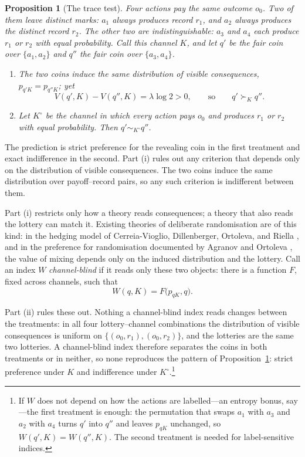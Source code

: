 \documentclass[11pt,a4paper]{article}
\newtheorem{proposition}[theorem]{Proposition}
\theoremstyle{definition}
\newcommand{\1}{\mathbf 1}
\begin{document}
\begin{proposition}[The trace test]\label{prop:signature}
Four actions pay the same outcome $o_0$.  Two of them leave distinct marks: $a_1$ always produces record $r_1$,
and $a_2$ always produces the distinct record $r_2$.  The other two are indistinguishable: $a_3$ and $a_4$ each
produce $r_1$ or $r_2$ with equal probability.  Call this channel $K$, and let $q'$ be the fair coin over
$\{a_1,a_2\}$ and $q''$ the fair coin over $\{a_3,a_4\}$.
\begin{enumerate}[label=\textup{(\roman*)},leftmargin=*]
\item The two coins induce the same distribution of visible consequences, $p_{q'K}=p_{q''K}$; yet
\[
 V(q',K)-V(q'',K)=\lambda\log2>0,
 \qquad\text{so}\qquad
 q'\succ_Kq''.
\]
\item Let $K^\circ$ be the channel in which every action pays $o_0$ and produces $r_1$ or $r_2$ with equal
probability.  Then $q'\sim_{K^\circ}q''$.
\end{enumerate}
\end{proposition}

The prediction is strict preference for the revealing coin in the first treatment and exact indifference in the
second.  Part \textup{(i)} rules out any criterion that depends only on the distribution of visible consequences.
The two coins induce the same distribution over payoff--record pairs, so any such criterion is indifferent between them.

Part \textup{(i)} restricts only how a theory reads consequences; a theory that also reads the lottery can
match it.  Existing theories of deliberate randomisation are of this kind: in the hedging model
of Cerreia-Vioglio, Dillenberger, Ortoleva, and Riella \cite{CerreiaVioglioDillenbergerOrtolevaRiella2019}, and
in the preference for randomisation documented by Agranov and Ortoleva \cite{AgranovOrtoleva2017}, the value of
mixing depends only on the induced distribution and the lottery.  Call an index $W$ \emph{channel-blind} if it
reads only these two objects: there is a function $F$, fixed across channels, such that
\[
 W(q,K)=F\bigl(p_{qK},q\bigr).
\]

Part \textup{(ii)}  rules these out.  Nothing a channel-blind index reads changes between the treatments: in
all four lottery--channel combinations the distribution of visible consequences is uniform on
$\{(o_0,r_1),(o_0,r_2)\}$, and the lotteries are the same two lotteries.  A channel-blind index therefore
separates the coins in both treatments or in neither, so none reproduces the pattern of
Proposition~\ref{prop:signature}: strict preference under $K$ and indifference under
$K^\circ$.\footnote{If $W$ does not depend on how the actions are labelled---an entropy bonus, say---the first
treatment is enough: the permutation that swaps $a_1$ with $a_3$ and $a_2$ with $a_4$ turns $q'$ into $q''$ and
leaves $p_{qK}$ unchanged, so $W(q',K)=W(q'',K)$.  The second treatment is needed for label-sensitive indices.}
\end{document}
